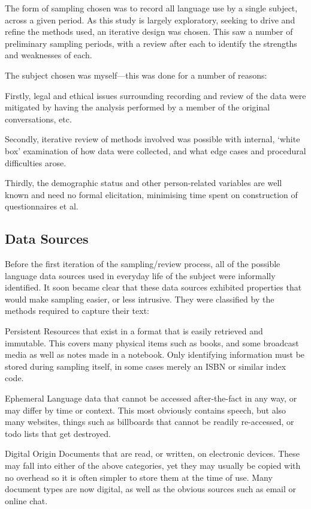 
The form of sampling chosen was to record all language use by a single subject, across a given period.  As this study is largely exploratory, seeking to drive and refine the methods used, an iterative design was chosen.  This saw a number of preliminary sampling periods, with a review after each to identify the strengths and weaknesses of each.

The subject chosen was myself---this was done for a number of reasons:

Firstly, legal and ethical issues surrounding recording and review of the data were mitigated by having the analysis performed by a member of the original conversations, etc.

Secondly, iterative review of methods involved was possible with internal, `white box' examination of how data were collected, and what edge cases and procedural difficulties arose.

Thirdly, the demographic status and other person-related variables are well known and need no formal elicitation, minimising time spent on construction of questionnaires et al.


\subsection{Data Sources}
Before the first iteration of the sampling/review process, all of the possible language data sources used in everyday life of the subject were informally identified.  It soon became clear that these data sources exhibited properties that would make sampling easier, or less intrusive.  They were classified by the methods required to capture their text:

\begin{itemizeTitle}
    \item[Persistent] Resources that exist in a format that is easily retrieved and immutable.  This covers many physical items such as books, and some broadcast media as well as notes made in a notebook.  Only identifying information must be stored during sampling itself, in some cases merely an ISBN or similar index code.
    \item[Ephemeral] Language data that cannot be accessed after-the-fact in any way, or may differ by time or context.  This most obviously contains speech, but also many websites, things such as billboards that cannot be readily re-accessed, or todo lists that get destroyed.
    \item[Digital Origin] Documents that are read, or written, on electronic devices.  These may fall into either of the above categories, yet they may usually be copied with no overhead so it is often simpler to store them at the time of use.  Many document types are now digital, as well as the obvious sources such as email or online chat.
\end{itemizeTitle}


